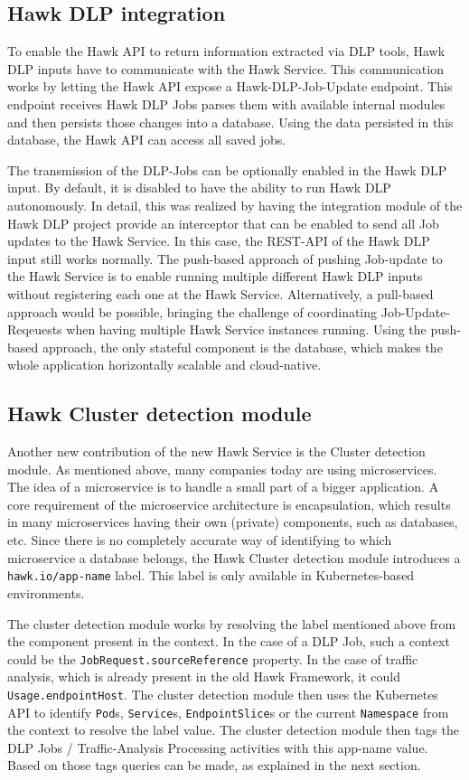 \subsection{Hawk DLP integration}
To enable the Hawk API to return information extracted via DLP tools, Hawk DLP inputs have to communicate with the Hawk Service. This communication works by letting the Hawk API expose a Hawk-DLP-Job-Update endpoint. This endpoint receives Hawk DLP Jobs parses them with available internal modules and then persists those changes into a database. Using the data persisted in this database, the Hawk API can access all saved jobs.

The transmission of the DLP-Jobs can be optionally enabled in the Hawk DLP input. By default, it is disabled to have the ability to run Hawk DLP autonomously. 
In detail, this was realized by having the integration module of the Hawk DLP project provide an interceptor that can be enabled to send all Job updates to the Hawk Service. In this case, the REST-API of the Hawk DLP input still works normally. The push-based approach of pushing Job-update to the Hawk Service is to enable running multiple different Hawk DLP inputs without registering each one at the Hawk Service. Alternatively, a pull-based approach would be possible, bringing the challenge of coordinating Job-Update-Reqeuests when having multiple Hawk Service instances running. Using the push-based approach, the only stateful component is the database, which makes the whole application horizontally scalable and cloud-native.

\subsection{Hawk Cluster detection module}
Another new contribution of the new Hawk Service is the Cluster detection module.
As mentioned above, many companies today are using microservices. The idea of a microservice is to handle a small part of a bigger application. A core requirement of the microservice architecture is encapsulation, which results in many microservices having their own (private) components, such as databases, etc. Since there is no completely accurate way of identifying to which microservice a database belongs, the Hawk Cluster detection module introduces a \texttt{hawk.io/app-name} label. This label is only available in Kubernetes-based environments.

The cluster detection module works by resolving the label mentioned above from the component present in the context. In the case of a DLP Job, such a context could be the \texttt{JobRequest.sourceReference} property. In the case of traffic analysis, which is already present in the old Hawk Framework, it could \texttt{Usage.endpointHost}. The cluster detection module then uses the Kubernetes API to identify \texttt{Pod}s, \texttt{Service}s, \texttt{EndpointSlice}s or the current \texttt{Namespace} from the context to resolve the label value. The cluster detection module then tags the DLP Jobs / Traffic-Analysis Processing activities with this app-name value. Based on those tags queries can be made, as explained in the next section.

